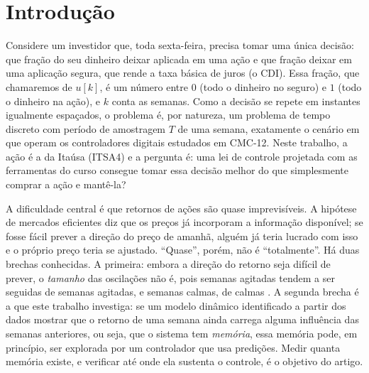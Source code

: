 \documentclass[conference]{IEEEtran}
\begin{document}
\section{Introdução}

Considere um investidor que, toda sexta-feira, precisa tomar uma única decisão: que fração do seu dinheiro deixar aplicada em uma ação e que fração deixar em uma aplicação segura, que rende a taxa básica de juros (o CDI). Essa fração, que chamaremos de $u[k]$, é um número entre $0$ (todo o dinheiro no seguro) e $1$ (todo o dinheiro na ação), e $k$ conta as semanas. Como a decisão se repete em instantes igualmente espaçados, o problema é, por natureza, um problema de tempo discreto com período de amostragem $T$ de uma semana, exatamente o cenário em que operam os controladores digitais estudados em CMC-12. Neste trabalho, a ação é a da Itaúsa (ITSA4) e a pergunta é: uma lei de controle projetada com as ferramentas do curso consegue tomar essa decisão melhor do que simplesmente comprar a ação e mantê-la?

A dificuldade central é que retornos de ações são quase imprevisíveis. A hipótese de mercados eficientes \cite{fama1970} diz que os preços já incorporam a informação disponível; se fosse fácil prever a direção do preço de amanhã, alguém já teria lucrado com isso e o próprio preço teria se ajustado. ``Quase'', porém, não é ``totalmente''. Há duas brechas conhecidas. A primeira: embora a direção do retorno seja difícil de prever, o \emph{tamanho} das oscilações não é, pois semanas agitadas tendem a ser seguidas de semanas agitadas, e semanas calmas, de calmas \cite{engle1982,bollerslev1986,cont2001}. A segunda brecha é a que este trabalho investiga: se um modelo dinâmico identificado a partir dos dados mostrar que o retorno de uma semana ainda carrega alguma influência das semanas anteriores, ou seja, que o sistema tem \emph{memória}, essa memória pode, em princípio, ser explorada por um controlador que usa predições. Medir quanta memória existe, e verificar até onde ela sustenta o controle, é o objetivo do artigo.
\end{document}

